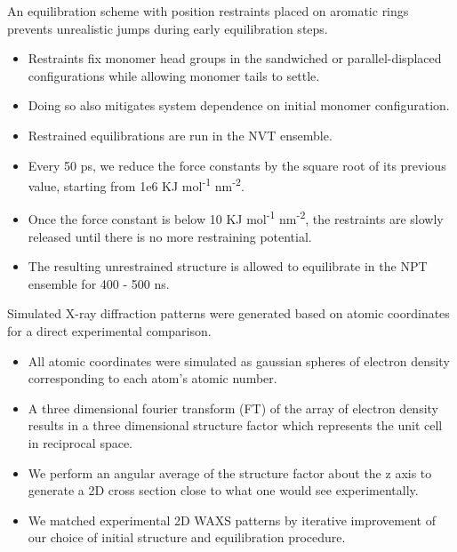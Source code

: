 \documentclass{article}
\begin{document}
  An equilibration scheme with position restraints placed on aromatic rings
  prevents unrealistic jumps during early equilibration steps.
  \begin{itemize}
    \item Restraints fix monomer head groups in the sandwiched or parallel-displaced
    configurations while allowing monomer tails to settle.
    \item Doing so also mitigates system dependence on initial monomer configuration.
    \item Restrained equilibrations are run in the NVT ensemble.
    \item Every 50 ps, we reduce the force constants by the square root of its 
    previous value, starting from 1e6 KJ mol\textsuperscript{-1} nm\textsuperscript{-2}.
    \item Once the force constant is below 10 KJ mol\textsuperscript{-1} 
    nm\textsuperscript{-2}, the restraints are slowly released until there is no more 
    restraining potential.  %
    \item The resulting unrestrained structure is allowed to equilibrate in the NPT
    ensemble for 400 - 500 ns.
  \end{itemize}
  
  Simulated X-ray diffraction patterns were generated based on atomic
  coordinates for a direct experimental comparison.
  \begin{itemize}
    \item All atomic coordinates were simulated as gaussian spheres of electron
    density corresponding to each atom's atomic number.
    \item A three dimensional fourier transform (FT) of the array of electron 
    density results in a three dimensional structure factor which represents
    the unit cell in reciprocal space.
    \item We perform an angular average of the structure factor about the 
    z axis to generate a 2D cross section close to what one would see 
    experimentally.
    \item We matched experimental 2D WAXS patterns by iterative improvement
    of our choice of initial structure and equilibration procedure.
  \end{itemize}
  
\end{document}
